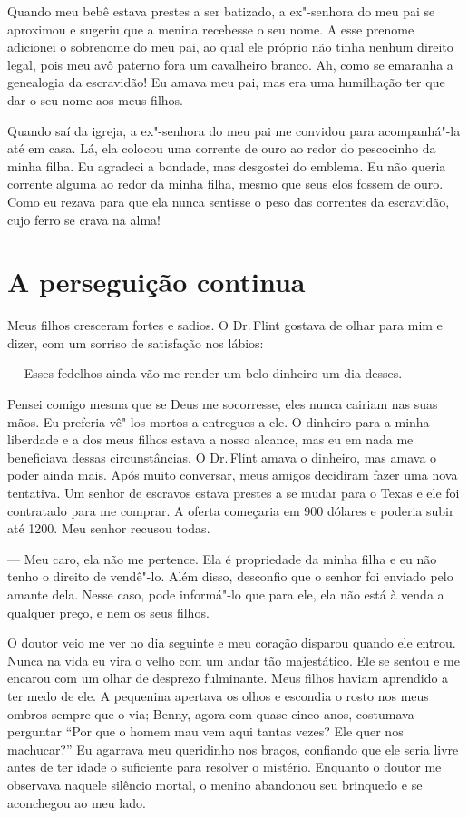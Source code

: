 Quando meu bebê estava prestes a ser
batizado, a ex"-senhora do meu pai se aproximou e sugeriu que a menina
recebesse o seu nome. A esse prenome adicionei o sobrenome do meu pai,
ao qual ele próprio não tinha nenhum direito legal, pois meu avô paterno
fora um cavalheiro branco. Ah, como se emaranha a genealogia da
escravidão! Eu amava meu pai, mas era uma humilhação ter que dar o seu
nome aos meus filhos.

Quando saí da igreja, a ex"-senhora do
meu pai me convidou para acompanhá"-la até em casa. Lá, ela colocou uma
corrente de ouro ao redor do pescocinho da minha filha. Eu agradeci a
bondade, mas desgostei do emblema. Eu não queria corrente alguma ao
redor da minha filha, mesmo que seus elos fossem de ouro. Como eu rezava
para que ela nunca sentisse o peso das correntes da escravidão, cujo
ferro se crava na alma!

\chapter*{A perseguição continua}

Meus filhos cresceram fortes e sadios.
O Dr.\,Flint gostava de olhar para mim e dizer, com um sorriso de
satisfação nos lábios:

--- Esses fedelhos ainda vão me render um belo dinheiro um dia desses.

Pensei comigo mesma que se Deus me
socorresse, eles nunca cairiam nas suas mãos. Eu preferia vê"-los mortos
a entregues a ele. O dinheiro para a minha liberdade e a dos meus filhos
estava a nosso alcance, mas eu em nada me beneficiava dessas
circunstâncias. O Dr.\,Flint amava o dinheiro, mas amava o poder ainda
mais. Após muito conversar, meus amigos decidiram fazer uma nova
tentativa. Um senhor de escravos estava prestes a se mudar para o Texas
e ele foi contratado para me comprar. A oferta começaria em 900 dólares
e poderia subir até 1200. Meu senhor recusou todas.

--- Meu caro, ela não me pertence. Ela é propriedade da minha filha e eu
não tenho o direito de vendê"-lo. Além disso, desconfio que o senhor foi
enviado pelo amante dela. Nesse caso, pode informá"-lo que para ele, ela
não está à venda a qualquer preço, e nem os seus filhos.

O doutor veio me ver no dia seguinte e
meu coração disparou quando ele entrou. Nunca na vida eu vira o velho
com um andar tão majestático. Ele se sentou e me encarou com um olhar de
desprezo fulminante. Meus filhos haviam aprendido a ter medo de ele. A
pequenina apertava os olhos e escondia o rosto nos meus ombros sempre
que o via; Benny, agora com quase cinco anos, costumava perguntar ``Por
que o homem mau vem aqui tantas vezes? Ele quer nos machucar?'' Eu
agarrava meu queridinho nos braços, confiando que ele seria livre antes
de ter idade o suficiente para resolver o mistério. Enquanto o doutor me
observava naquele silêncio mortal, o menino abandonou seu brinquedo e se
aconchegou ao meu lado.


